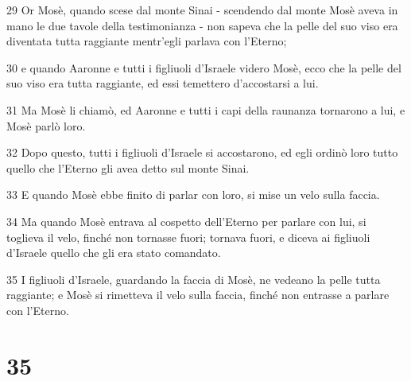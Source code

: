 \par 29 Or Mosè, quando scese dal monte Sinai - scendendo dal monte Mosè aveva in mano le due tavole della testimonianza - non sapeva che la pelle del suo viso era diventata tutta raggiante mentr'egli parlava con l'Eterno;
\par 30 e quando Aaronne e tutti i figliuoli d'Israele videro Mosè, ecco che la pelle del suo viso era tutta raggiante, ed essi temettero d'accostarsi a lui.
\par 31 Ma Mosè li chiamò, ed Aaronne e tutti i capi della raunanza tornarono a lui, e Mosè parlò loro.
\par 32 Dopo questo, tutti i figliuoli d'Israele si accostarono, ed egli ordinò loro tutto quello che l'Eterno gli avea detto sul monte Sinai.
\par 33 E quando Mosè ebbe finito di parlar con loro, si mise un velo sulla faccia.
\par 34 Ma quando Mosè entrava al cospetto dell'Eterno per parlare con lui, si toglieva il velo, finché non tornasse fuori; tornava fuori, e diceva ai figliuoli d'Israele quello che gli era stato comandato.
\par 35 I figliuoli d'Israele, guardando la faccia di Mosè, ne vedeano la pelle tutta raggiante; e Mosè si rimetteva il velo sulla faccia, finché non entrasse a parlare con l'Eterno.

\chapter{35}

